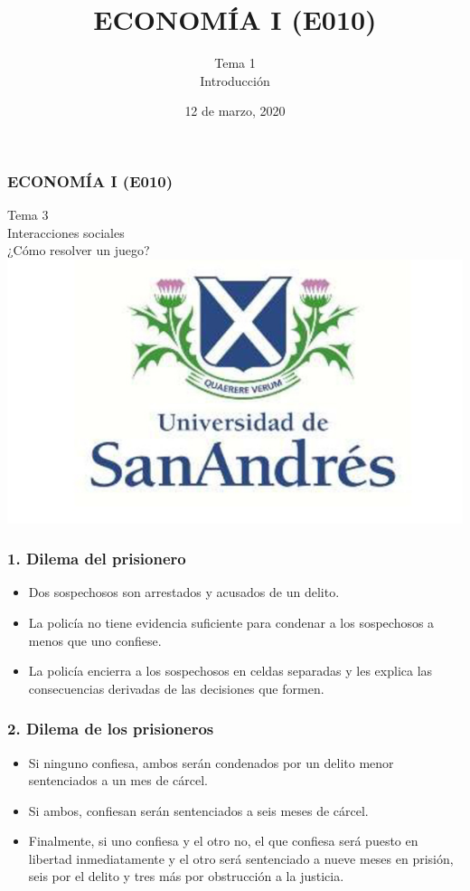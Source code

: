 \documentclass[14pt]{beamer}
\title{ECONOM\'{I}A I (E010)}
\subtitle{Tema 1 \\ Introducción}
\date{12 de marzo, 2020}
\begin{document}

\begin{frame}
\frametitle{ECONOM\'{I}A I (E010)}
\centering
Tema 3 \\ \vspace{4mm} Interacciones sociales \\ \vspace{4mm} ¿Cómo resolver un juego? \\ \vspace{4mm} \includegraphics[scale=0.25]{Figures/logoUDESA.jpg} 
\end{frame}

\begin{frame}
\frametitle{1. Dilema del prisionero}
\begin{itemize}
\item Dos sospechosos son arrestados y acusados de un delito.
\item La policía no tiene evidencia suficiente para condenar a los sospechosos a menos que uno confiese.
\item La policía encierra a los sospechosos en celdas separadas y les explica las consecuencias derivadas de las decisiones que formen.
\end{itemize}
\end{frame}

\begin{frame}
\frametitle{2. Dilema de los prisioneros}
\begin{itemize}
\item Si ninguno confiesa, ambos serán condenados por un delito menor sentenciados a un mes de cárcel. 
\item Si ambos, confiesan serán sentenciados a seis meses de cárcel. 
\item Finalmente, si uno confiesa y el otro no, el que confiesa será puesto en libertad inmediatamente y el otro
será sentenciado a nueve meses en prisión, seis por el delito y tres más por obstrucción a la justicia.
\end{itemize}
\end{frame}
\end{document}
